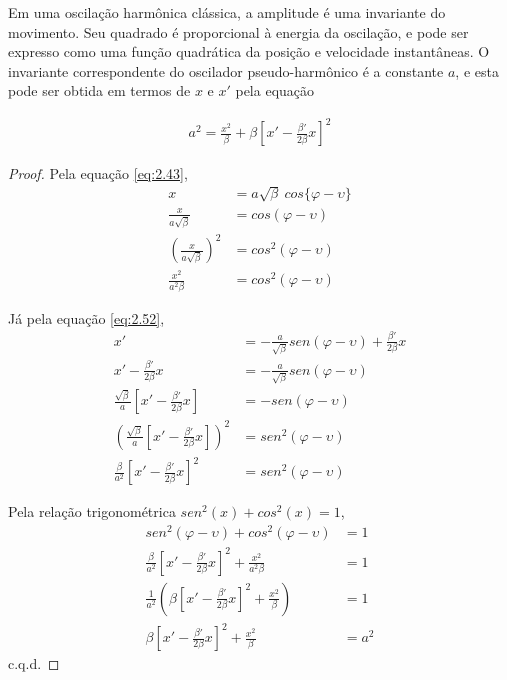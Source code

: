Em uma oscilação harmônica clássica, a amplitude é uma invariante do movimento. Seu quadrado é proporcional à energia da oscilação, e pode ser expresso como uma função quadrática da posição e velocidade instantâneas. O invariante correspondente do oscilador pseudo-harmônico é a constante $a$, e esta pode ser obtida em termos de $x$ e $x'$ pela equação
	
\begin{align}
	a^2 = \frac{x^2}{\beta} + \beta\left[x'-\frac{\beta'}{2\beta}x\right]^2\label{eq:2.56}
\end{align}
	
\begin{proof}
	Pela equação \eqref{eq:2.43},
	\begin{align*}
        x &= a\sqrt{\beta}\ cos\{\varphi-\upsilon\}\\
        \frac{x}{a\sqrt{\beta}} &= cos(\varphi-\upsilon)\\
        \left(\frac{x}{a\sqrt{\beta}}\right)^2 &= cos^2(\varphi-\upsilon)\\
        \frac{x^2}{a^2\beta} &= cos^2(\varphi-\upsilon)
	\end{align*}
	
	Já pela equação \eqref{eq:2.52},
	\begin{align*}
        x' &= - \frac{a}{\sqrt{\beta}}sen(\varphi-\upsilon)+\frac{\beta'}{2\beta}x\\
        x' - \frac{\beta'}{2\beta}x&= - \frac{a}{\sqrt{\beta}}sen(\varphi-\upsilon)\\
        \frac{\sqrt{\beta}}{a}\left[x' - \frac{\beta'}{2\beta}x\right]&= -sen(\varphi-\upsilon)\\
        \left(\frac{\sqrt{\beta}}{a}\left[x' - \frac{\beta'}{2\beta}x\right]\right)^2&= sen^2(\varphi-\upsilon)\\
        \frac{\beta}{a^2}\left[x' - \frac{\beta'}{2\beta}x\right]^2&= sen^2(\varphi-\upsilon)
	\end{align*}
	
	Pela relação trigonométrica $sen^2(x)+cos^2(x)=1$,
	\begin{align*}
        sen^2(\varphi-\upsilon)+cos^2(\varphi-\upsilon)&=1\\
        \frac{\beta}{a^2}\left[x' - \frac{\beta'}{2\beta}x\right]^2 + \frac{x^2}{a^2\beta} &= 1\\
        \frac{1}{a^2}\left(\beta\left[x' - \frac{\beta'}{2\beta}x\right]^2 + \frac{x^2}{\beta}\right) &= 1\\
        \beta\left[x' - \frac{\beta'}{2\beta}x\right]^2 + \frac{x^2}{\beta} &= a^2
	\end{align*}
	c.q.d.
\end{proof}
	
